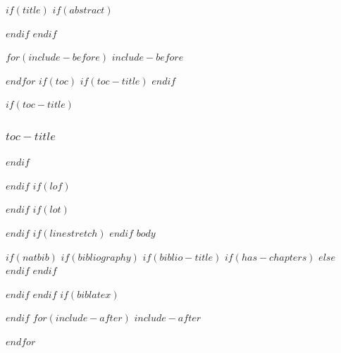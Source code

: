 \documentclass[
$if(fontsize)$
  $fontsize$,
$endif$
  ignorenonframetext,
  notheorems,
$if(handout)$
  handout,
$endif$
$if(aspectratio)$
  aspectratio=$aspectratio$,
$endif$
$if(babel-lang)$
  $babel-lang$,
$endif$
$for(classoption)$
  $classoption$$sep$,
$endfor$
]{$documentclass$}
\title$if(shorttitle)$[$shorttitle$]$endif${\texorpdfstring{$title$}{$title-meta$}$if(thanks)$\thanks{$thanks$}$endif$}
\subtitle$if(shortsubtitle)$[$shortsubtitle$]$endif${\texorpdfstring{$subtitle$}{$subtitle-meta$}}
\author$if(shortauthor)$[$shortauthor$]$endif${\texorpdfstring{$for(author)$$author$$sep$ \and $endfor$}{$author-meta$}}
\date$if(shortdate)$[$shortdate$]$endif${$date$}
\institute$if(shortinstitute)$[$shortinstitute$]$endif${$for(institute)$$institute$$sep$ \and $endfor$}
\newif\ifbibliography
\begin{document}
$if(title)$
\frame{\titlepage}
$if(abstract)$
\begin{abstract}
$abstract$
\end{abstract}
$endif$
$endif$

$for(include-before)$
$include-before$

$endfor$
$if(toc)$
$if(toc-title)$
\renewcommand*\contentsname{$toc-title$}
$endif$
\begin{frame}[allowframebreaks]
$if(toc-title)$
  \frametitle{$toc-title$}
$endif$
  \setcounter{tocdepth}{$toc-depth$}
  \tableofcontents
\end{frame}
$endif$
$if(lof)$
\listoffigures
$endif$
$if(lot)$
\listoftables
$endif$
$if(linestretch)$
$endif$
$body$

$if(natbib)$
$if(bibliography)$
$if(biblio-title)$
$if(has-chapters)$
\renewcommand\bibname{$biblio-title$}
$else$
\renewcommand\refname{$biblio-title$}
$endif$
$endif$

$endif$
$endif$
$if(biblatex)$

$endif$
$for(include-after)$
$include-after$

$endfor$
\end{document}
